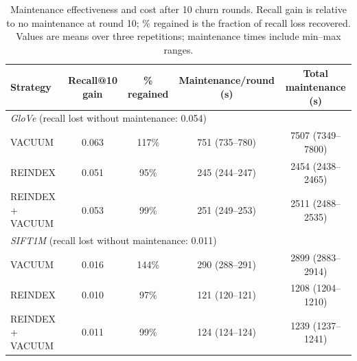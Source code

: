 \begin{table}[H]
\centering
\footnotesize
\caption{Maintenance effectiveness and cost after 10 churn rounds. Recall gain is relative to no maintenance at round 10; \% regained is the fraction of recall loss recovered. Values are means over three repetitions; maintenance times include min--max ranges.}
\label{tab:maintenance}
\begin{tabular}{lcccc}
\hline
\textbf{Strategy} & \textbf{Recall@10 gain} & \textbf{\% regained} & \textbf{Maintenance/round (s)} & \textbf{Total maintenance (s)} \\
\hline
\multicolumn{5}{l}{\textit{GloVe} (recall lost without maintenance: 0.054)} \\
VACUUM & 0.063 & 117\% & 751 (735--780) & 7507 (7349--7800) \\
REINDEX & 0.051 & 95\% & 245 (244--247) & 2454 (2438--2465) \\
REINDEX + VACUUM & 0.053 & 99\% & 251 (249--253) & 2511 (2488--2535) \\
\hline
\multicolumn{5}{l}{\textit{SIFT1M} (recall lost without maintenance: 0.011)} \\
VACUUM & 0.016 & 144\% & 290 (288--291) & 2899 (2883--2914) \\
REINDEX & 0.010 & 97\% & 121 (120--121) & 1208 (1204--1210) \\
REINDEX + VACUUM & 0.011 & 99\% & 124 (124--124) & 1239 (1237--1241) \\
\hline
\end{tabular}
\end{table}
